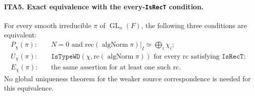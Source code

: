 \paragraph{ITA5. Exact equivalence with the every-\texttt{IsRecT} condition.}
\label{claim:ITA5}
For every smooth irreducible $\pi$ of $\operatorname{GL}_n(F)$,
the following three conditions are equivalent:
\begin{align*}
 P_\chi(\pi):\quad &N=0\text{ and }
     \mathrm{rec}(\operatorname{algNorm}\pi)|_I
                                  \simeq\bigoplus_i\chi_i;\\
 U_\chi(\pi):\quad &\texttt{IsTypeWD}
       (\chi,\mathrm{rc}(\operatorname{algNorm}\pi))
                     \text{ for every }\mathrm{rc}\text{ satisfying }
                     \texttt{IsRecT};\\
 E_\chi(\pi):\quad &\text{the same assertion for at least one such }
                     \mathrm{rc}.
\end{align*}
No global uniqueness theorem for the weaker source correspondence
is needed for this equivalence.
